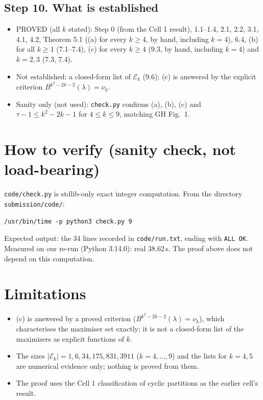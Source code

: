 \documentclass[11pt]{article}
\begin{document}
\subsection*{Step 10. What is established}
\begin{itemize}
\item PROVED (all $k$ stated): Step 0 (from the Cell 1 result), 1.1--1.4, 2.1, 2.2, 3.1, 4.1, 4.2, Theorem 5.1 ((a) for every $k\ge4$, by hand, including $k=4$), 6.4, (b) for all $k\ge1$ (7.1--7.4), (c) for every $k\ge4$ (9.3, by hand, including $k=4$) and $k=2,3$ (7.3, 7.4).
\item Not established: a closed-form list of $\mathcal E_k$ (9.6); (c) is answered by the explicit criterion $B^{k^2-2k-2}(\lambda)=\nu_k$.
\item Sanity only (not used): \texttt{check.py} confirms (a), (b), (c) and $\tau-1\le k^2-2k-1$ for $4\le k\le9$, matching GH Fig.~1.
\end{itemize}

\section*{How to verify (sanity check, not load-bearing)}
\texttt{code/check.py} is stdlib-only exact integer computation. From the directory \texttt{submission/code/}:
\begin{verbatim}
/usr/bin/time -p python3 check.py 9
\end{verbatim}
Expected output: the 34 lines recorded in \texttt{code/run.txt}, ending with \texttt{ALL OK}. Measured on our re-run (Python 3.14.0): real 38.62\,s. The proof above does not depend on this computation.

\section*{Limitations}
\begin{itemize}
\item (c) is answered by a proved criterion ($B^{k^2-2k-2}(\lambda)=\nu_k$), which characterises the maximiser set exactly; it is not a closed-form list of the maximisers as explicit functions of $k$.
\item The sizes $|\mathcal E_k|=1,6,34,175,831,3911$ ($k=4,\dots,9$) and the lists for $k=4,5$ are numerical evidence only; nothing is proved from them.
\item The proof uses the Cell 1 classification of cyclic partitions as the earlier cell's result.
\end{itemize}
\end{document}
